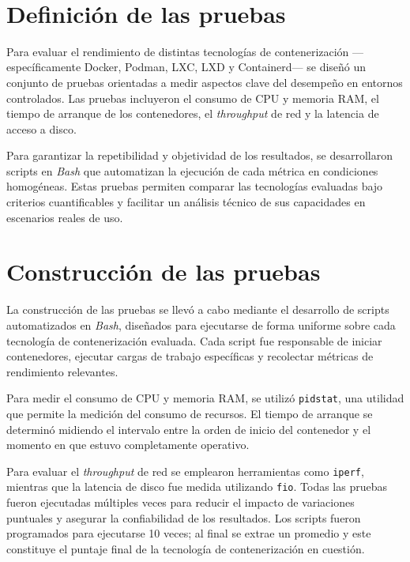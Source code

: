 \label{cap:benchmarking}

\mbox{}\\
\section{Definición de las pruebas}

Para evaluar el rendimiento de distintas tecnologías de contenerización ---específicamente Docker, Podman, LXC, LXD y Containerd--- se diseñó un conjunto de pruebas orientadas a medir aspectos clave del desempeño en entornos controlados. Las pruebas incluyeron el consumo de CPU y memoria RAM, el tiempo de arranque de los contenedores, el \textit{throughput} de red y la latencia de acceso a disco. 

Para garantizar la repetibilidad y objetividad de los resultados, se desarrollaron scripts en \textit{Bash} que automatizan la ejecución de cada métrica en condiciones homogéneas. Estas pruebas permiten comparar las tecnologías evaluadas bajo criterios cuantificables y facilitar un análisis técnico de sus capacidades en escenarios reales de uso.

\section{Construcción de las pruebas}

La construcción de las pruebas se llevó a cabo mediante el desarrollo de scripts automatizados en \textit{Bash}, diseñados para ejecutarse de forma uniforme sobre cada tecnología de contenerización evaluada. Cada script fue responsable de iniciar contenedores, ejecutar cargas de trabajo específicas y recolectar métricas de rendimiento relevantes.

Para medir el consumo de CPU y memoria RAM, se utilizó \texttt{pidstat}, una utilidad que permite la medición del consumo de recursos. El tiempo de arranque se determinó midiendo el intervalo entre la orden de inicio del contenedor y el momento en que estuvo completamente operativo. 

Para evaluar el \textit{throughput} de red se emplearon herramientas como \texttt{iperf}, mientras que la latencia de disco fue medida utilizando \texttt{fio}. Todas las pruebas fueron ejecutadas múltiples veces para reducir el impacto de variaciones puntuales y asegurar la confiabilidad de los resultados. Los scripts fueron programados para ejecutarse 10 veces; al final se extrae un promedio y este constituye el puntaje final de la tecnología de contenerización en cuestión.

